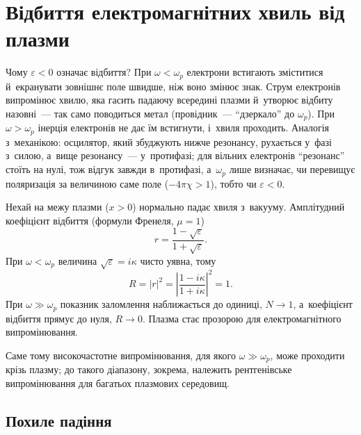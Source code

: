 \section{Відбиття електромагнітних хвиль від плазми}\label{sec:reflection}

Чому $\varepsilon<0$ означає відбиття? При $\omega<\omega_p$ електрони встигають зміститися й~екранувати зовнішнє поле швидше,
ніж воно змінює знак. Струм електронів випромінює хвилю, яка гасить падаючу всередині плазми й~утворює відбиту назовні~---
так само поводиться метал (провідник~--- \enquote{дзеркало} до $\omega_p$). При $\omega>\omega_p$ інерція електронів не дає їм встигнути,
і~хвиля проходить. Аналогія з~механікою: осцилятор, який збуджують нижче резонансу, рухається у~фазі з~силою, а~вище резонансу~---
у~протифазі; для вільних електронів \enquote{резонанс} стоїть на нулі, тож відгук завжди в~протифазі, а~$\omega_p$ лише визначає, чи перевищує поляризація за величиною саме поле ($-4\pi\chi>1$), тобто чи $\varepsilon<0$.

Нехай на межу плазми ($x>0$) нормально падає хвиля з~вакууму. Амплітудний коефіцієнт
відбиття (формули Френеля, $\mu=1$)
\begin{equation*}
	r=\frac{1-\sqrt\varepsilon}{1+\sqrt\varepsilon}.
\end{equation*}
При $\omega<\omega_p$ величина $\sqrt\varepsilon=i\kappa$ чисто уявна, тому
\begin{equation*}
	R=|r|^2=\left|\frac{1-i\kappa}{1+i\kappa}\right|^2=1.
\end{equation*}
При $\omega\gg\omega_p$ показник заломлення наближається до одиниці, $N\to1$, а~коефіцієнт
відбиття прямує до нуля, $R\to0$. Плазма стає прозорою для електромагнітного
випромінювання.

Саме тому високочастотне випромінювання, для якого $\omega\gg\omega_p$, може проходити
крізь плазму; до такого діапазону, зокрема, належить рентгенівське випромінювання для
багатьох плазмових середовищ.

\subsection*{Похиле падіння}


